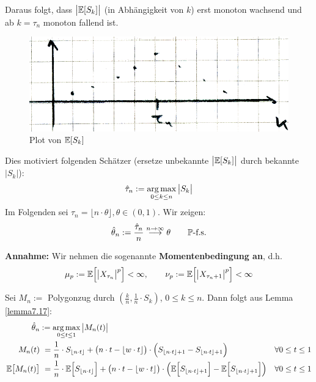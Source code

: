 Daraus folgt, dass $\big|\E[S_k]\big|$ (in Abhängigkeit von $k$) erst monoton wachsend und ab $k=\tau_n$ monoton fallend ist.

\begin{figure}[H] %
	\begin{center}
		\includegraphics[width=1\textwidth]{./pics/MSTAT004.png}
		\caption{Plot von $\E[S_k]$}
	\end{center}
\end{figure}

Dies motiviert folgenden Schätzer (ersetze unbekannte $\big|\E[S_k]\big|$ durch bekannte $|S_k|$):
\begin{align*}
	\hat{\tau}_n:=\argmax\limits_{0\leq k\leq n}\big|S_k\big|
\end{align*}
Im Folgenden sei $\tau_n=\lfloor n\cdot\theta\rfloor,\theta\in(0,1)$.
Wir zeigen:
\begin{align*}
	\hat{\theta}_n:=\frac{\hat{\tau}_n}{n}\overset{n\to\infty}{\longrightarrow}\theta\qquad\P\text{-f.s.}
\end{align*}

\textbf{Annahme:} Wir nehmen die sogenannte \textbf{Momentenbedingung an}, d.h.
\begin{align*}
	\mu_p:=\E\Big[\big|X_{\tau_n}\big|^p\Big]<\infty,
	\qquad
	\nu_p:=\E\Big[\big|X_{\tau_n+1}\big|^p\Big]<\infty
\end{align*}

Sei $M_n:=$ Polygonzug durch $\left(\frac{k}{n},\frac{1}{n}\cdot S_k\right)$, $0\leq k\leq n$.
Dann folgt aus Lemma \ref{lemma7.17}:
\begin{align*}
	\hat{\theta}_n&:=\argmax\limits_{0\leq t\leq 1}\big|M_n(t)\big|\\
	M_n(t)&~=\frac{1}{n}\cdot S_{\lfloor n\cdot t\rfloor}+\big(n\cdot t-\lfloor w\cdot t\rfloor\big)\cdot\Big(S_{\lfloor n\cdot t\rfloor+1}-S_{\lfloor n\cdot t\rfloor+1}\Big) &\forall 0\leq t\leq 1\\
	\E\big[M_n(t)\big]&~=\frac{1}{n}\cdot\E\Big[ S_{\lfloor n\cdot t\rfloor}\Big]+\big(n\cdot t-\lfloor w\cdot t\rfloor\big)\cdot
	\Big(\E\Big[S_{\lfloor n\cdot t\rfloor+1}\Big]-\E\Big[S_{\lfloor n\cdot t\rfloor+1}\Big]\Big) &\forall 0\leq t\leq 1\\
\end{align*}

